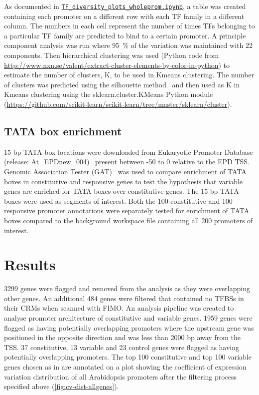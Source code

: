 \documentclass[../main.tex]{subfiles}
\begin{document}
As documented in \href{https://github.com/Switham1/PromoterArchitecture/blob/master/src/plotting/TF_diversity_plots_wholeprom.ipynb}{\texttt{TF\_diversity\_plots\_wholeprom.ipynb}}, a table was created containing each promoter on a different row with each TF family in a different column.
The numbers in each cell represent the number of times TFs belonging to a particular TF family are predicted to bind to a certain promoter.
A principle component analysis was run where \SI{95}{\percent} of the variation was maintained with 22 components.
Then hierarchical clustering was used (Python code from \url{http://www.nxn.se/valent/extract-cluster-elements-by-color-in-python}) to estimate the number of clusters, K, to be used in Kmeans clustering.
The number of clusters was predicted using the silhouette method~\autocite{rousseeuwSilhouettesGraphicalAid1987} and then used as K in Kmeans clustering using the sklearn.cluster.KMeans Python module (\url{https://github.com/scikit-learn/scikit-learn/tree/master/sklearn/cluster}).

\subsection{TATA box enrichment}
\label{chapter1:methods:tata-box-enrichment}

15 bp TATA box locations were downloaded from Eukaryotic Promoter Database (release: At\_EPDnew\_004)~\autocite{dreosEukaryoticPromoterDatabase2017} present between -50 to 0 relative to the EPD TSS.
Genomic Association Tester (GAT)~\autocite{hegerGATSimulationFramework2013} was used to
compare enrichment of TATA boxes in constitutive and responsive genes to test the hypothesis that variable genes are enriched for TATA boxes over constitutive genes.
The 15 bp TATA boxes were used as segments of interest. Both the 100 constitutive and 100 responsive promoter annotations were separately tested for enrichment of TATA boxes compared to the background workspace file containing all 200 promoters of interest.

\section{Results}
\label{chapter1:results}
3299 genes were flagged and removed from the analysis as they were overlapping other genes.
An additional 484 genes were filtered that contained no TFBSs in their CRMs when scanned with FIMO. 
An analysis pipeline was created to analyse promoter architecture of constitutive and variable genes.
1959 genes were flagged as having potentially overlapping promoters where the upstream gene was positioned in the opposite direction and was less than 2000 bp away from the TSS.
37 constitutive, 13 variable and 23 control genes were flagged as having potentially overlapping promoters.
The top 100 constitutive and top 100 variable genes chosen as in \textcite{czechowskiGenomeWideIdentificationTesting2005} are annotated on a plot showing the  coefficient of expression variation distribution of all Arabidopsis promoters after the filtering process specified above (\autoref{fig:cv-dist-allgenes}).
\end{document}
